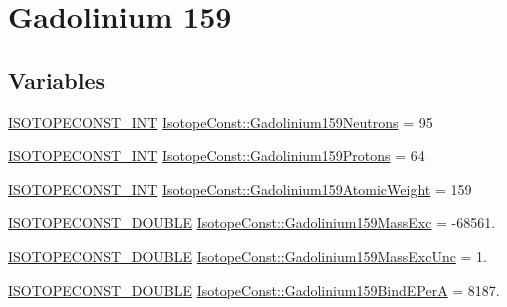 \hypertarget{group___isotope_const-_gadolinium-_gd159}{}\section{Gadolinium 159}
\label{group___isotope_const-_gadolinium-_gd159}
\subsection*{Variables}
\begin{DoxyCompactItemize}
\item 
\mbox{\hyperlink{group___isotope_const-_macros_ga5f18360b3e99483a35c32d789e62621c}{I\+S\+O\+T\+O\+P\+E\+C\+O\+N\+S\+T\+\_\+\+I\+NT}} \mbox{\hyperlink{group___isotope_const-_gadolinium-_gd159_gacc130b20394afb6dfe41041a931baaf2}{Isotope\+Const\+::\+Gadolinium159\+Neutrons}} = 95
\item 
\mbox{\hyperlink{group___isotope_const-_macros_ga5f18360b3e99483a35c32d789e62621c}{I\+S\+O\+T\+O\+P\+E\+C\+O\+N\+S\+T\+\_\+\+I\+NT}} \mbox{\hyperlink{group___isotope_const-_gadolinium-_gd159_gad7a2afe566db859569f31e3359955d09}{Isotope\+Const\+::\+Gadolinium159\+Protons}} = 64
\item 
\mbox{\hyperlink{group___isotope_const-_macros_ga5f18360b3e99483a35c32d789e62621c}{I\+S\+O\+T\+O\+P\+E\+C\+O\+N\+S\+T\+\_\+\+I\+NT}} \mbox{\hyperlink{group___isotope_const-_gadolinium-_gd159_ga788e6bed20981ece0e4496b8e4968c50}{Isotope\+Const\+::\+Gadolinium159\+Atomic\+Weight}} = 159
\item 
\mbox{\hyperlink{group___isotope_const-_macros_ga8f45a7272ce02c0b4c65c44636ed719a}{I\+S\+O\+T\+O\+P\+E\+C\+O\+N\+S\+T\+\_\+\+D\+O\+U\+B\+LE}} \mbox{\hyperlink{group___isotope_const-_gadolinium-_gd159_ga2cdd3042f6fc842d1e5a5c69b83c3890}{Isotope\+Const\+::\+Gadolinium159\+Mass\+Exc}} = -\/68561.
\item 
\mbox{\hyperlink{group___isotope_const-_macros_ga8f45a7272ce02c0b4c65c44636ed719a}{I\+S\+O\+T\+O\+P\+E\+C\+O\+N\+S\+T\+\_\+\+D\+O\+U\+B\+LE}} \mbox{\hyperlink{group___isotope_const-_gadolinium-_gd159_ga611d2323419c07d3e646203fcb5d3ceb}{Isotope\+Const\+::\+Gadolinium159\+Mass\+Exc\+Unc}} = 1.
\item 
\mbox{\hyperlink{group___isotope_const-_macros_ga8f45a7272ce02c0b4c65c44636ed719a}{I\+S\+O\+T\+O\+P\+E\+C\+O\+N\+S\+T\+\_\+\+D\+O\+U\+B\+LE}} \mbox{\hyperlink{group___isotope_const-_gadolinium-_gd159_ga5165a8f0da15954f0ca4034e441a82af}{Isotope\+Const\+::\+Gadolinium159\+Bind\+E\+PerA}} = 8187.

\end{DoxyCompactItemize}
